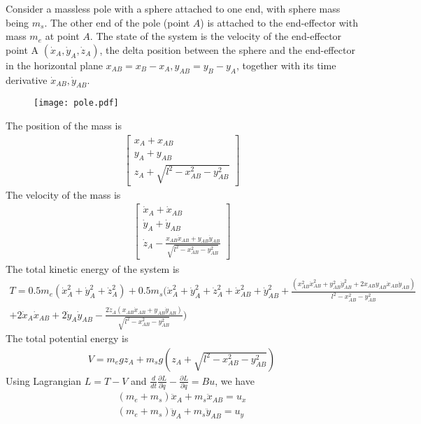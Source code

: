 \documentclass{article}
\begin{document}
Consider a massless pole with a sphere attached to one end, with sphere mass being $m_s$. The other end of the pole (point $A$) is attached to the end-effector with mass $m_e$ at point $A$. The state of the system is the velocity of the end-effector point A $(\dot{x}_A, \dot{y}_A, \dot{z}_A)$, the delta position between the sphere and the end-effector in the horizontal plane $x_{AB} = x_B - x_A, y_{AB} = y_B-y_A$, together with its time derivative $\dot{x}_{AB}, \dot{y}_{AB}$.

\begin{figure}
	\centering
	\texttt{[image: pole.pdf]}
\end{figure}

The position of the mass is
\begin{align}
	\begin{bmatrix}
		x_A + x_{AB}\\
		y_A + y_{AB}\\
		z_A + \sqrt{l^2 - x_{AB}^2 - y_{AB}^2}
	\end{bmatrix}
\end{align}
The velocity of the mass is
\begin{align}
	\begin{bmatrix}
		\dot{x}_A + \dot{x}_{AB}\\
		\dot{y}_A + \dot{y}_{AB}\\
		\dot{z}_A - \frac{x_{AB}\dot{x}_{AB} + y_{AB}\dot{y}_{AB}}{\sqrt{l^2-x_{AB}^2 - y_{AB}^2}}
	\end{bmatrix}
\end{align}
The total kinetic energy of the system is
\begin{multline}
	T = 0.5 m_e (\dot{x}_A^2 + \dot{y}_A^2 +\dot{z}_A^2) + 0.5 m_s(\dot{x}_A^2 + \dot{y}_A^2 + \dot{z}_A^2 + \dot{x}_{AB}^2 + \dot{y}_{AB}^2 + \frac{(x_{AB}^2\dot{x}_{AB}^2 + y_{AB}^2\dot{y}_{AB}^2 + 2x_{AB}y_{AB}\dot{x}_{AB}\dot{y}_{AB})}{l^2-x_{AB}^2-y_{AB}^2}\\
	+ 2\dot{x}_A\dot{x}_{AB} + 2\dot{y}_A\dot{y}_{AB} - \frac{2\dot{z}_A(x_{AB}\dot{x}_{AB}+y_{AB}\dot{y}_{AB})}{\sqrt{l^2-x_{AB}^2-y_{AB}^2}})
\end{multline}
The total potential energy is
\begin{align}
	V = m_egz_A + m_sg(z_A + \sqrt{l^2-x_{AB}^2-y_{AB}^2})
\end{align}
Using Lagrangian $L = T-V$ and $\frac{d}{dt}\frac{\partial L}{\partial \dot{q}}-\frac{\partial L}{\partial q} = Bu$, we have
\begin{align}
	(m_e + m_s)\ddot{x}_A + m_s\ddot{x}_{AB} = u_x\\
	(m_e + m_s)\ddot{y}_A + m_s\ddot{y}_{AB} = u_y
\end{align}
\end{document}
